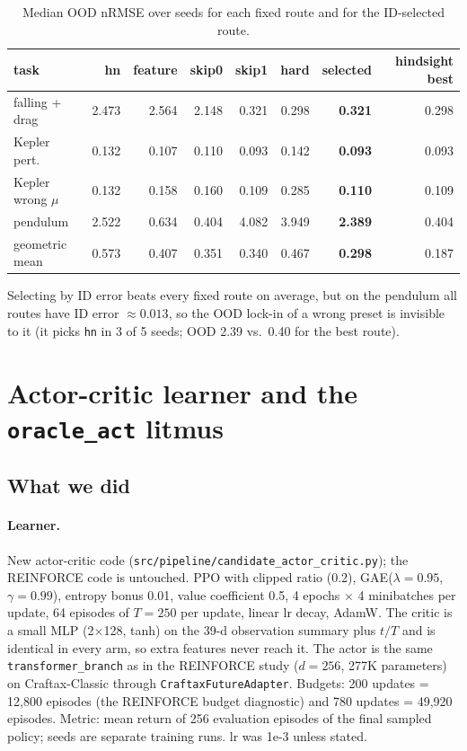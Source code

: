 \documentclass[11pt]{article}
\newcommand{\srcpath}[1]{\texttt{\small #1}}
\begin{document}
\begin{table}[h]
\centering\small
\caption{Median OOD nRMSE over seeds for each fixed route and for the ID-selected route.}
\begin{tabular}{lrrrrrrr}
\toprule
task & hn & feature & skip0 & skip1 & hard & \textbf{selected} & hindsight best \\
\midrule
falling + drag & 2.473 & 2.564 & 2.148 & 0.321 & 0.298 & \textbf{0.321} & 0.298 \\
Kepler pert. & 0.132 & 0.107 & 0.110 & 0.093 & 0.142 & \textbf{0.093} & 0.093 \\
Kepler wrong $\mu$ & 0.132 & 0.158 & 0.160 & 0.109 & 0.285 & \textbf{0.110} & 0.109 \\
pendulum & 2.522 & 0.634 & 0.404 & 4.082 & 3.949 & \textbf{2.389} & 0.404 \\
\midrule
geometric mean & 0.573 & 0.407 & 0.351 & 0.340 & 0.467 & \textbf{0.298} & 0.187 \\
\bottomrule
\end{tabular}
\end{table}
Selecting by ID error beats every fixed route on average, but on the pendulum all routes have ID error $\approx0.013$, so the OOD lock-in of a wrong preset is invisible to it (it picks \texttt{hn} in 3 of 5 seeds; OOD 2.39 vs.\ 0.40 for the best route).

\section{Actor-critic learner and the \texttt{oracle\_act} litmus}

\subsection{What we did}
\paragraph{Learner.} New actor-critic code (\srcpath{src/pipeline/candidate\_actor\_critic.py}); the REINFORCE code is untouched. PPO with clipped ratio (0.2), GAE($\lambda=0.95$, $\gamma=0.99$), entropy bonus 0.01, value coefficient 0.5, 4 epochs $\times$ 4 minibatches per update, 64 episodes of $T=250$ per update, linear lr decay, AdamW. The critic is a small MLP (2$\times$128, tanh) on the 39-d observation summary plus $t/T$ and is identical in every arm, so extra features never reach it.
The actor is the same \texttt{transformer\_branch} as in the REINFORCE study ($d=256$, 277K parameters) on Craftax-Classic through \texttt{CraftaxFutureAdapter}. Budgets: 200 updates = 12{,}800 episodes (the REINFORCE budget diagnostic) and 780 updates = 49{,}920 episodes. Metric: mean return of 256 evaluation episodes of the final sampled policy; seeds are separate training runs. lr was 1e-3 unless stated.
\end{document}
